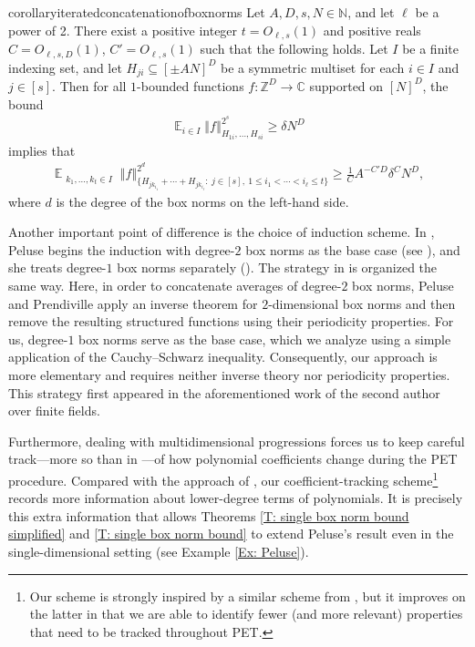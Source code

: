 \documentclass[11pt]{amsart}
\theoremstyle{definition}
\DeclareMathOperator*{\E}{\mathbb{E}}
\newcommand{\C}{{\mathbb C}}
\newcommand{\N}{{\mathbb N}}
\newcommand{\Z}{{\mathbb Z}}
\newcommand{\norm}[1]{\left\Vert #1\right\Vert}
\begin{document}
\begin{restatable}{corollary}{iteratedconcatenationofboxnorms}\label{C: iterated concatenation for general groups}
    Let $A, D, s,N\in\N$, and let $\ell$ be a power of 2. There exist a positive integer $t=O_{\ell,s}(1)$ and positive reals $C=O_{\ell,s,D}(1)$, $C'=O_{\ell,s}(1)$  such that the following holds. Let $I$ be a finite indexing set, and let $H_{ji}\subseteq [\pm AN]^D$ be a symmetric
   multiset for each $i\in I$ and $j\in[s]$. Then for all $1$-bounded functions $f:\Z^D\to\C$ supported on $[N]^D$, the bound
    \begin{align*}
        \E_{i\in I}\norm{f}_{H_{1i}, \ldots, H_{si}}^{2^{s}}\geq \delta N^D
    \end{align*}
    implies that
    \begin{align}\label{E: iterated concatenation}
        \E_{\substack{k_1, \ldots, k_t\in I}}\norm{f}_{\{H_{j k_{i_1}}+\cdots + H_{j k_{i_{\ell}}}:\ j\in[s],\ 1\leq i_1<\cdots < i_{\ell}\leq t\}}^{2^d}\geq \frac{1}{C} A^{-C'D} \delta^C N^D,
    \end{align}
    where $d$ is the degree of the box norms on the left-hand side. 
\end{restatable}

Another important point of difference is the choice of induction scheme.  In \cite{Pel20}, Peluse begins the induction with degree-$2$ box norms as the base case (see \cite[Lemma 5.5]{Pel20}), and she treats degree-$1$ box norms separately (\cite[Lemma 5.4]{Pel20}).  The strategy in \cite{PP19, Pre20b} is organized the same way. 
Here, in order to concatenate averages of degree-$2$ box norms, Peluse and Prendiville apply an inverse theorem for $2$-dimensional box norms and then remove the resulting structured functions using their periodicity properties. For us, degree-$1$ box norms serve as the base case, which we analyze using a simple application of the Cauchy--Schwarz inequality. Consequently, our approach is more elementary and requires neither inverse theory nor periodicity properties.  This strategy first appeared in the aforementioned work of the second author~\cite{Kuc23} over finite fields.

Furthermore, dealing with multidimensional progressions forces us to keep careful track---more so than in \cite{Pel20}---of how polynomial coefficients change during the PET procedure.  Compared with the approach of \cite{Pel20}, our coefficient-tracking scheme\footnote{Our scheme is strongly inspired by a similar scheme from \cite{DFKS22}, but it improves on the latter in that we are able to identify fewer (and more relevant) properties that need to be tracked throughout PET.} records more information about lower-degree terms of polynomials. It is precisely this extra information that allows Theorems \ref{T: single box norm bound simplified} and \ref{T: single box norm bound} to extend Peluse's result even in the single-dimensional setting (see Example \ref{Ex: Peluse}).
\end{document}

